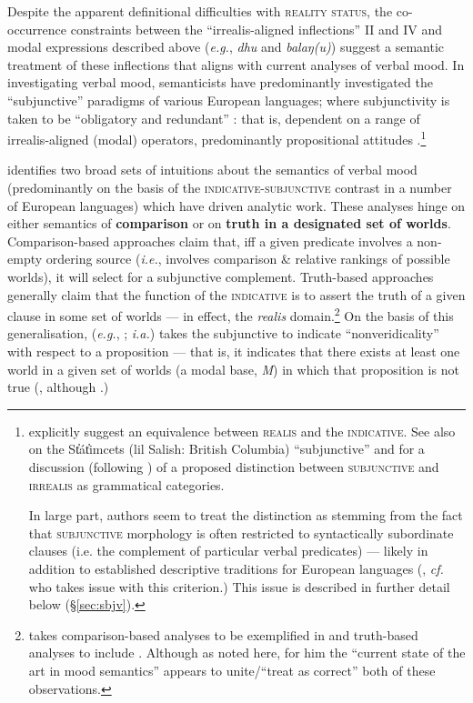 Despite the apparent definitional difficulties with \textsc{reality status}, the co-occurrence constraints between the ``irrealis-aligned inflections'' \gls{II} and \gls{IV} and modal expressions described above (\textit{e.g.}, \textit{dhu }and\textit{ balaŋ(u)}) suggest a semantic treatment of these inflections that aligns with current analyses of verbal mood. In investigating verbal mood, semanticists have predominantly investigated  the ``subjunctive'' paradigms of various European languages; where subjunctivity is taken to be ``obligatory and redundant'' : that is, dependent on a range of irrealis-aligned (modal) operators, predominantly propositional attitudes \citep{Palmer2001}.\footnote{\citet[238]{Chung} explicitly suggest an equivalence between \textsc{realis} and the \textsc{indicative}. See also \citealt{Matthewson2010} on the St̓át̓imcets (\gls{lil} Salish: British Columbia) ``subjunctive'' and for a discussion (following \citealt{Palmer2001}) of a proposed distinction between \textsc{subjunctive} and \textsc{irrealis} as grammatical categories.
	
	In large part, authors seem to treat the distinction as stemming from the fact that \textsc{subjunctive} morphology is often restricted to syntactically subordinate clauses (i.e. the complement of particular verbal predicates) --- likely in addition to established descriptive traditions for European languages (\citealp[see also][169\textit{ff}]{Mauri2016}, \textit{cf. }\citet[13, fn 9]{Matthewson2010} who takes issue with this criterion.) This issue is described in further detail below (\S\ref{sec:sbjv}).\label{SJVvIRR}}

\citet[§ 2.2]{Portner2018a} identifies two broad sets of intuitions about the semantics of verbal mood (predominantly on the basis of the \textsc{indicative-subjunctive} contrast in a number of European languages) which have driven analytic work. These analyses hinge on either semantics of \textbf{comparison} or on \textbf{truth in a designated set of worlds}. Comparison-based approaches claim that, iff a given predicate involves a non-empty ordering source (\textit{i.e.}, involves comparison \& relative rankings of possible worlds), it will select for a subjunctive complement. Truth-based approaches generally claim that the function  of the \textsc{indicative} is to assert the truth of a given clause in some set of worlds --- in effect, the \textit{realis} domain.\footnote{\citet{Portner2018a} takes comparison-based analyses to be exemplified in \citealt{Portner2012,Anand2013,Giorgi1997,Villalta2008} and truth-based analyses to include \citealt{Giannakidou2011,Farkas1992,Farkas2003,Huntley1984,Quer2001,Portner1997}. Although as noted here, for him the ``current state of the art in mood semantics'' appears to unite/``treat as correct'' both of these observations.} On the basis of this generalisation, \citeauthor{Gian2016} (\textit{e.g.}, \citeyear{Gian2016}; \citealp{Giannakidou2020} \textit{i.a.}) takes the subjunctive to indicate ``nonveridicality'' with respect to a proposition --- that is, it indicates that there exists at least one world in a given set of worlds (a modal base, \textit{M}) in which that proposition is not true (, although \citet[\textit{cf.}][]{Wilt2016}.)

